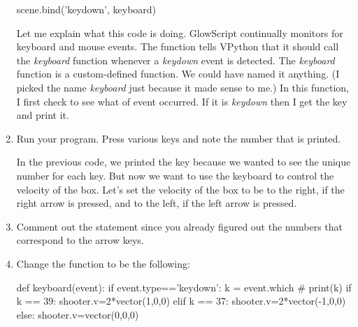 \begin{enumerate}
\begin{myvpython}
scene.bind('keydown', keyboard) 
\end{myvpython}

Let me explain what this code is doing. GlowScript continually monitors for keyboard and mouse events. The  function tells VPython that it should call the \emph{keyboard} function whenever a \emph{keydown} event is detected. The \emph{keyboard} function is a custom-defined function. We could have named it anything. (I picked the name \emph{keyboard} just because it made sense to me.) In this function, I first check to see what  of event occurred. If it is \emph{keydown} then I get the key and print it.

	\item Run your program. Press various keys and note the number that is printed.
	

	In the previous code, we printed the key because we wanted to see the unique number for each key. But now we want to use the keyboard to control the velocity of the box. Let's set the velocity of the box to be to the right, if the right arrow is pressed, and to the left, if the left arrow is pressed.
	
	\item Comment out the  statement since you already figured out the numbers that correspond to the arrow keys.
	
	\item Change the  function to be the following:
	
\begin{myvpython}
def keyboard(event):
    if event.type=='keydown':
        k = event.which
#        print(k)
        if k == 39:
            shooter.v=2*vector(1,0,0)
        elif k == 37:
            shooter.v=2*vector(-1,0,0)
        else:
            shooter.v=vector(0,0,0)
\end{myvpython}


\end{enumerate}
